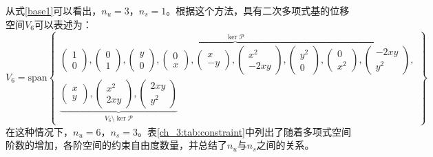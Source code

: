 从式\eqref{base1}可以看出，$n_u=3$，$n_s=1$。根据这个方法，具有二次多项式基的位移空间$V_6$可以表述为：
\begin{equation}\label{base2}
    V_6 = \mathrm{span}
    \begin{Bmatrix}
        \overbrace{
        \begin{pmatrix} 1 \\ 0 \end{pmatrix},
        \begin{pmatrix} 0 \\ 1 \end{pmatrix},
        \begin{pmatrix} y \\ 0 \end{pmatrix},
        \begin{pmatrix} 0 \\ x \end{pmatrix},
        \begin{pmatrix} x \\ -y \end{pmatrix},
        \begin{pmatrix} x^2 \\ -2xy \end{pmatrix},
        \begin{pmatrix} y^2 \\ 0 \end{pmatrix},
        \begin{pmatrix} 0 \\ x^2 \end{pmatrix},
        \begin{pmatrix} -2xy \\ y^2 \end{pmatrix}
        }^{\ker \mathcal P}, \\
        \underbrace{
        \begin{pmatrix} x \\ y \end{pmatrix},
        \begin{pmatrix} x^2 \\ 2xy \end{pmatrix},
        \begin{pmatrix} 2xy \\ y^2 \end{pmatrix}
        }_{V_6\setminus \ker \mathcal P}
    \end{Bmatrix}
\end{equation}
在这种情况下，$n_u=6$，$n_s=3$。表\ref{ch_3:tab:constraint}中列出了随着多项式空间阶数的增加，各阶空间的约束自由度数量，并总结了$n_u$与$n_s$之间的关系。
